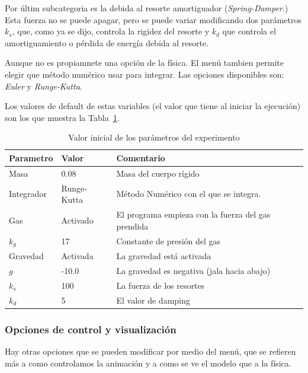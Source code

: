 Por últim subcategoria es la debida al resorte amortiguador (\emph{\textenglish{Spring-Damper}}.)
Esta fuerza no se puede apagar, pero se puede variar modificando dos parámetros $k_{s}$, que, como ya se dijo, controla la rigidez del resorte y $k_{d}$ que controla el amortiguamiento o pérdida de energía debida al resorte.

Aunque no es propiamnete una opción de la física. El menú tambien permite elegir que método numérico usar para integrar.
Las opciones disponibles son: \emph{Euler} y \emph{Runge-Kutta}.

Los valores de default de estas variables (el valor que tiene al iniciar la ejecución) son los que muestra la Tabla~\ref{valores:variables}.

\begin{table}
\begin{center}
\begin{tabular} {@{}llp{10cm}@{}}
\toprule
Parametro & Valor & Comentario\\
\midrule
 Masa & 0.08 & Masa del cuerpo rígido \\
 Integrador & Runge-Kutta & Método Numérico con el que se integra. \\
 Gas & Activado & El programa empieza con la fuerza del gas prendida \\
 $k_g$ & 17 & Constante de presión del gas \\
 Gravedad & Activada & La gravedad está activada \\
 $g$ & -10.0 & La gravedad es negativa (jala hacia abajo) \\
 $k_s$ & 100 & La fuerza de los resortes \\
 $k_d$ & 5 & El valor de damping \\
\bottomrule
\end{tabular}
\end{center}
\caption[Tabla con los valores de defecto de los parámetros]{Valor inicial de los parámetros del experimento}
\label{valores:variables}
\end{table}

\subsubsection{Opciones de control y visualización}
Hay otras opciones que se pueden modificar por medio del menú, que se refieren más a como controlamos la animación y a como se ve el modelo que a la física.

